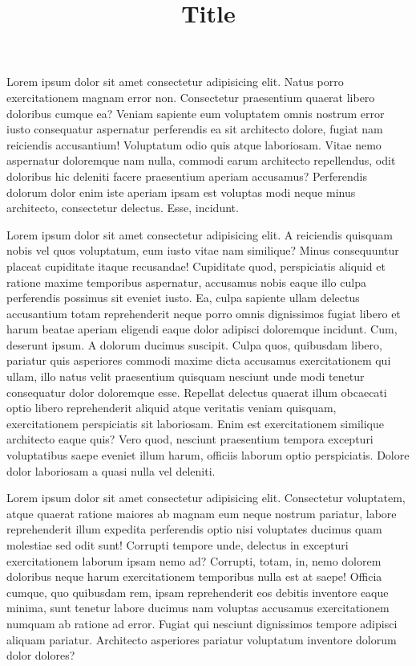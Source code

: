 \documentclass[UTF8]{mcmthesis}
\title{\bfseries Title}  %
\begin{document}
    \begin{summary}
        Lorem ipsum dolor sit amet consectetur adipisicing elit. Natus porro exercitationem magnam error non. Consectetur praesentium quaerat libero doloribus cumque ea? Veniam sapiente eum voluptatem omnis nostrum error iusto consequatur aspernatur perferendis ea sit architecto dolore, fugiat nam reiciendis accusantium! Voluptatum odio quis atque laboriosam. Vitae nemo aspernatur doloremque nam nulla, commodi earum architecto repellendus, odit doloribus hic deleniti facere praesentium aperiam accusamus? Perferendis dolorum dolor enim iste aperiam ipsam est voluptas modi neque minus architecto, consectetur delectus. Esse, incidunt.

        Lorem ipsum dolor sit amet consectetur adipisicing elit. A reiciendis quisquam nobis vel quos voluptatum, eum iusto vitae nam similique? Minus consequuntur placeat cupiditate itaque recusandae! Cupiditate quod, perspiciatis aliquid et ratione maxime temporibus aspernatur, accusamus nobis eaque illo culpa perferendis possimus sit eveniet iusto. Ea, culpa sapiente ullam delectus accusantium totam reprehenderit neque porro omnis dignissimos fugiat libero et harum beatae aperiam eligendi eaque dolor adipisci doloremque incidunt. Cum, deserunt ipsum. A dolorum ducimus suscipit. Culpa quos, quibusdam libero, pariatur quis asperiores commodi maxime dicta accusamus exercitationem qui ullam, illo natus velit praesentium quisquam nesciunt unde modi tenetur consequatur dolor doloremque esse. Repellat delectus quaerat illum obcaecati optio libero reprehenderit aliquid atque veritatis veniam quisquam, exercitationem perspiciatis sit laboriosam. Enim est exercitationem similique architecto eaque quis? Vero quod, nesciunt praesentium tempora excepturi voluptatibus saepe eveniet illum harum, officiis laborum optio perspiciatis. Dolore dolor laboriosam a quasi nulla vel deleniti.

        Lorem ipsum dolor sit amet consectetur adipisicing elit. Consectetur voluptatem, atque quaerat ratione maiores ab magnam eum neque nostrum pariatur, labore reprehenderit illum expedita perferendis optio nisi voluptates ducimus quam molestiae sed odit sunt! Corrupti tempore unde, delectus in excepturi exercitationem laborum ipsam nemo ad? Corrupti, totam, in, nemo dolorem doloribus neque harum exercitationem temporibus nulla est at saepe! Officia cumque, quo quibusdam rem, ipsam reprehenderit eos debitis inventore eaque minima, sunt tenetur labore ducimus nam voluptas accusamus exercitationem numquam ab ratione ad error. Fugiat qui nesciunt dignissimos tempore adipisci aliquam pariatur. Architecto asperiores pariatur voluptatum inventore dolorum dolor dolores?


\end{summary}
\end{document}
